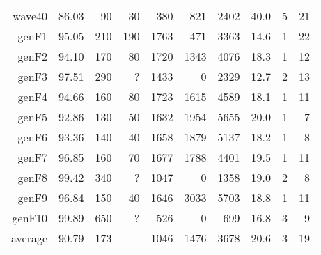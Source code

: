 \begin{table}
\begin{tabular}{|r|r|r|r|r|r|r|r|r|r|}
{\sc wave40} & 86.03 & 90 & 30 & 380 & 821 & 2402 & 40.0 & 5 & 21 \\
{\sc genF1} & 95.05 & 210 & 190 & 1763 & 471 & 3363 & 14.6 & 1 & 22 \\
{\sc genF2} & 94.10 & 170 & 80 & 1720 & 1343 & 4076 & 18.3 & 1 & 12 \\
{\sc genF3} & 97.51 & 290 & ? & 1433 & 0 & 2329 & 12.7 & 2 & 13 \\
{\sc genF4} & 94.66 & 160 & 80 & 1723 & 1615 & 4589 & 18.1 & 1 & 11 \\
{\sc genF5} & 92.86 & 130 & 50 & 1632 & 1954 & 5655 & 20.0 & 1 & 7 \\
{\sc genF6} & 93.36 & 140 & 40 & 1658 & 1879 & 5137 & 18.2 & 1 & 8 \\
{\sc genF7} & 96.85 & 160 & 70 & 1677 & 1788 & 4401 & 19.5 & 1 & 11 \\
{\sc genF8} & 99.42 & 340 & ? & 1047 & 0 & 1358 & 19.0 & 2 & 8 \\
{\sc genF9} & 96.84 & 150 & 40 & 1646 & 3033 & 5703 & 18.8 & 1 & 11 \\
{\sc genF10} & 99.89 & 650 & ? & 526 & 0 & 699 & 16.8 & 3 & 9 \\
\hline
average & 90.79 & 173 &  -  & 1046 & 1476 & 3678 & 20.6 & 3 & 19 \\
\hline
\end{tabular}
\end{table}
\clearpage
